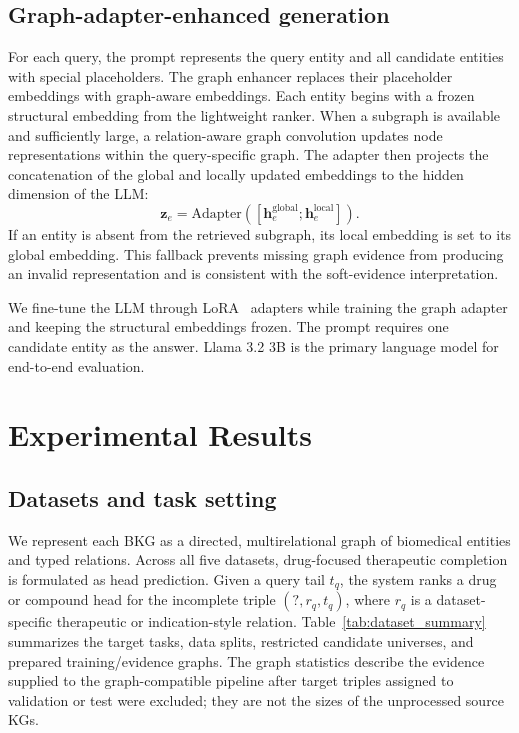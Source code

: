 \documentclass[pdflatex,sn-mathphys-num]{sn-jnl}
\newcommand{\tabref}[1]{Table~\ref{#1}}
\begin{document}
\subsection{Graph-adapter-enhanced generation}

For each query, the prompt represents the query entity and all candidate entities with special placeholders. The graph enhancer replaces their placeholder embeddings with graph-aware embeddings. Each entity begins with a frozen structural embedding from the lightweight ranker. When a subgraph is available and sufficiently large, a relation-aware graph convolution updates node representations within the query-specific graph. The adapter then projects the concatenation of the global and locally updated embeddings to the hidden dimension of the LLM:
\begin{equation}
\mathbf{z}_e =
\mathrm{Adapter}
\left(
[\mathbf{h}^{\mathrm{global}}_e;\mathbf{h}^{\mathrm{local}}_e]
\right).
\label{eq:adapter}
\end{equation}
If an entity is absent from the retrieved subgraph, its local embedding is set to its global embedding. This fallback prevents missing graph evidence from producing an invalid representation and is consistent with the soft-evidence interpretation.

We fine-tune the LLM through LoRA~\citep{hulora} adapters while training the graph adapter and keeping the structural embeddings frozen. The prompt requires one candidate entity as the answer. Llama 3.2 3B is the primary language model for end-to-end evaluation.


\section{Experimental Results}
\label{sec:results}

\subsection{Datasets and task setting}
\label{sec:study_datasets}

We represent each BKG as a directed, multirelational graph of biomedical entities and typed relations. Across all five datasets, drug-focused therapeutic completion is formulated as head prediction. Given a query tail $t_q$, the system ranks a drug or compound head for the incomplete triple $(?,r_q,t_q)$, where $r_q$ is a dataset-specific therapeutic or indication-style relation. \tabref{tab:dataset_summary} summarizes the target tasks, data splits, restricted candidate universes, and prepared training/evidence graphs. The graph statistics describe the evidence supplied to the graph-compatible pipeline after target triples assigned to validation or test were excluded; they are not the sizes of the unprocessed source KGs.
\end{document}
